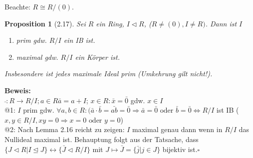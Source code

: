 \documentclass[10pt,a4paper]{article}
\newtheorem{prop}{Proposition}
\begin{document}
\smallskip
Beachte: $R \cong R/(0)$.
\begin{prop}[2.17]
 Sei $R$ ein Ring, $I \triangleleft R$, ($R \neq (0), I \neq R)$. Dann ist $I$
 \begin{enumerate}
  \item prim gdw. $R/I$ ein IB ist.
  \item maximal gdw. $R/I$ ein Körper ist.
 \end{enumerate}
Insbesondere ist jedes \emph{maximale Ideal} prim (Umkehrung gilt nicht!).
\end{prop}
\textbf{Beweis:}\\
$\bar{ } : R \rightarrow R/I; a \in R \bar{a} = a + I$; $x \in R : \bar{x} = \bar{0}$ gdw. $x \in I$\\
@1: $I$ prim gdw. $\forall a,b \in R : (\bar{a}\cdot \bar{b} = \bar{ab} = \bar{0}\Rightarrow \bar{a} = \bar{0} \textrm{ oder } \bar{b} = \bar{0} \Leftrightarrow R/I$ ist IB ($x,y \in R/I, xy = 0 \Rightarrow x =0 \textrm{ oder } y = 0$)\\
@2: Nach Lemma 2.16 reicht zu zeigen: $I$ maximal genau dann wenn in $R/I$ das Nullideal maximal ist. Behauptung folgt aus der Tatsache, dass $\lbrace J \triangleleft R | I \trianglelefteq J \rbrace \leftrightarrow \lbrace \bar J \triangleleft R/I \rbrace$ mit $J \mapsto \bar J = \lbrace \bar j|j\in J\rbrace$ bijektiv ist.$\square$
\end{document}
